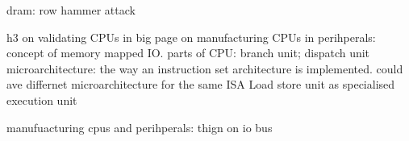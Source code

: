 dram: row hammer attack

h3 on validating CPUs in big page on manufacturing CPUs
in perihperals: concept of memory mapped IO.
parts of CPU: branch unit; dispatch unit
microarchitecture: the way  an instruction set architecture is implemented. could ave differnet microarchitecture for the same ISA
Load store unit as specialised execution unit

manufuacturing cpus and perihperals: thign on io bus


